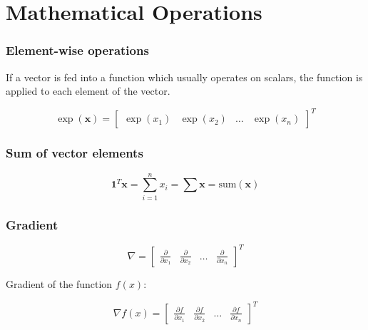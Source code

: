 
\chapter{Mathematical Operations}\label{ch:operations}


\subsection{Element-wise operations}\label{subsec:element-wise-operations}

If a vector is fed into a function which usually operates on scalars, the function is applied to each element of the vector.

\begin{equation}\label{eq:element-wise-operations}
    \exp (\bm{x}) =
    \begin{bmatrix}
        \exp(x_1) & \exp(x_2) & \ldots & \exp(x_n)
    \end{bmatrix}^T
\end{equation}


\subsection{Sum of vector elements}\label{subsec:sum-of-vector-elements}

\begin{equation}\label{eq:sum-of-vector-elements}
    \bm{1}^T \bm{x} = \sum_{i=1}^{n} x_i = \sum \bm{x} = \text{sum} (\bm{x})
\end{equation}


\subsection{Gradient}\label{subsec:gradient}

\begin{equation}\label{eq:gradient-operator}
    \nabla =
    \begin{bmatrix}
        \frac{\partial}{\partial x_1} & \frac{\partial}{\partial x_2} & \ldots & \frac{\partial}{\partial x_n}
    \end{bmatrix}^T
\end{equation}

Gradient of the function $f(x)$:

\begin{equation}\label{eq:gradient-of-a-function}
    \nabla f(x) =
    \begin{bmatrix}
        \frac{\partial f}{\partial x_1} & \frac{\partial f}{\partial x_2} & \ldots & \frac{\partial f}{\partial x_n}
    \end{bmatrix}^T
\end{equation}


